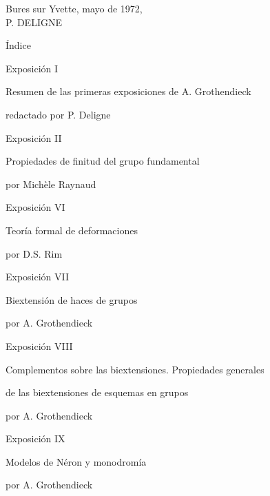 \begin{flushright}
Bures sur Yvette, mayo de 1972,\\
P. DELIGNE
\end{flushright}
\clearpage

\null
\clearpage

\begin{center}
Índice
\end{center}

\noindent
Exposición I\par
\hspace*{2em}Resumen de las primeras exposiciones de A. Grothendieck\par
\hspace*{2em}redactado por P. Deligne \par

\medskip
\noindent
Exposición II\par
\hspace*{2em}Propiedades de finitud del grupo fundamental\par
\hspace*{2em}por Michèle Raynaud \par

\medskip
\noindent
Exposición VI\par
\hspace*{2em}Teoría formal de deformaciones\par
\hspace*{2em}por D.S. Rim \par

\medskip
\noindent
Exposición VII\par
\hspace*{2em}Biextensión de haces de grupos\par
\hspace*{2em}por A. Grothendieck \par

\medskip
\noindent
Exposición VIII\par
\hspace*{2em}Complementos sobre las biextensiones. Propiedades generales\par
\hspace*{2em}de las biextensiones de esquemas en grupos\par
\hspace*{2em}por A. Grothendieck \par

\medskip
\noindent
Exposición IX\par
\hspace*{2em}Modelos de Néron y monodromía\par
\hspace*{2em}por A. Grothendieck \par
\clearpage

\null
\clearpage
